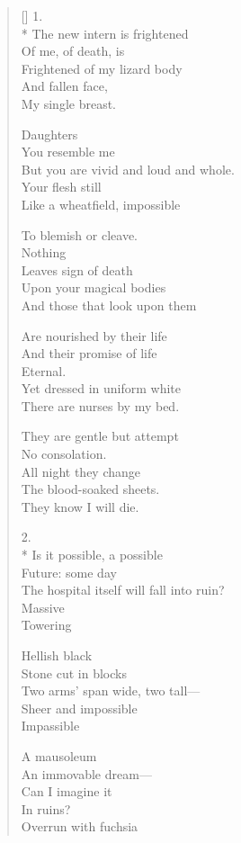 \label{ch:theknowledge}
\settowidth{\versewidth}{The hospital itself will fall into ruin?}
\begin{verse}[\versewidth]
1.\\*
The new intern is frightened\\
Of me, of death, is\\
Frightened of my lizard body\\
And fallen face,\\
My single breast.

Daughters\\
You resemble me\\
But you are vivid and loud and whole.\\
Your flesh still\\
Like a wheatfield, impossible

To blemish or cleave.\\
Nothing\\
Leaves sign of death\\
Upon your magical bodies\\
And those that look upon them

Are nourished by their life\\
And their promise of life\\
Eternal.\\
Yet dressed in uniform white\\
There are nurses by my bed.

They are gentle but attempt\\
No consolation.\\
All night they change\\
The blood-soaked sheets.\\
They know I will die.

2.\\*
Is it possible, a possible\\
Future: some day\\
The hospital itself will fall into ruin?\\
Massive\\
Towering

Hellish black\\
Stone cut in blocks\\
Two arms' span wide, two tall---\\
Sheer and impossible\\
Impassible

A mausoleum\\
An immovable dream---\\
Can I imagine it \\
In ruins?\\
Overrun with fuchsia


\end{verse}

